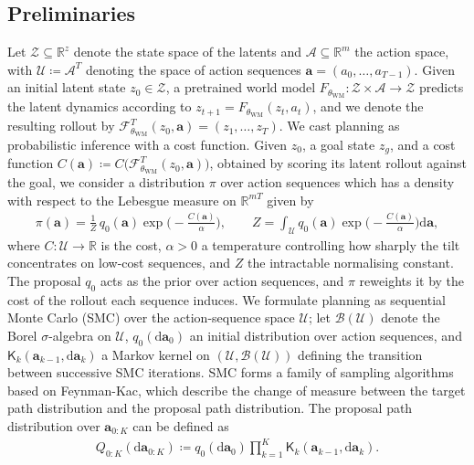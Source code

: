 \subsection{Preliminaries}

Let $\mathcal{Z}\subseteq\mathbb{R}^{z}$ denote the state space of the latents and $\mathcal{A}\subseteq\mathbb{R}^{m}$ the action space, with $\mathcal{U}\coloneqq\mathcal{A}^T$ denoting the space of action sequences $\mathbf{a}=(a_0,\ldots,a_{T-1})$. Given an initial latent state $z_0\in\mathcal{Z}$, a pretrained world model $F_{\theta_{\mathrm{WM}}}:\mathcal{Z}\times\mathcal{A}\rightarrow\mathcal{Z}$ predicts the latent dynamics according to $z_{t+1}=F_{\theta_{\mathrm{WM}}}(z_t,a_t)$, and we denote the resulting rollout by $\mathcal{F}_{\theta_{\mathrm{WM}}}^T(z_0,\mathbf{a})=(z_1,\ldots,z_T)$. We cast planning as probabilistic inference with a cost function. Given $z_0$, a goal state $z_g$, and a cost function  $C(\mathbf{a})\coloneqq C\big(\mathcal{F}^T_{\theta_{\mathrm{WM}}}(z_0,\mathbf{a})\big)$,
obtained by scoring its latent rollout against the goal, we consider a distribution $\pi$ over action sequences which has a density with respect to the Lebesgue measure on $\mathbb{R}^{mT}$ given by
\begin{align}\label{eq:planning_target}
\pi(\mathbf{a}) = \frac{1}{Z}\,q_0(\mathbf{a})\exp\!\Big(-\frac{C(\mathbf{a})}{\alpha}\Big),
\qquad
Z = \int_{\mathcal{U}} q_0(\mathbf{a})\exp\!\Big(-\frac{C(\mathbf{a})}{\alpha}\Big)\mathrm{d}\mathbf{a},
\end{align}
where $C:\mathcal{U}\rightarrow\mathbb{R}$ is the cost, $\alpha>0$ a temperature
controlling how sharply the tilt concentrates on low-cost sequences, and $Z$ the
intractable normalising constant. The proposal $q_0$ acts as the prior over action
sequences, and $\pi$ reweights it by the cost of the rollout each sequence induces. We formulate planning as sequential Monte Carlo (SMC) over the action-sequence space $\mathcal{U}$; let $\mathcal{B}(\mathcal{U})$ denote the Borel $\sigma$-algebra on $\mathcal{U}$, $q_0(\mathrm{d}\mathbf{a}_0)$ an initial distribution over action sequences, and $\mathsf{K}_k(\mathbf{a}_{k-1},\mathrm{d}\mathbf{a}_k)$ a Markov kernel on $(\mathcal{U},\mathcal{B}(\mathcal{U}))$ defining the transition between successive SMC iterations. SMC forms a family of sampling algorithms based on Feynman-Kac, which describe the change of measure between the target path distribution and the proposal path distribution. The proposal path distribution over $\mathbf{a}_{0:K}$ can be defined as 
\begin{align}
Q_{0:K}(\mathrm{d}\mathbf{a}_{0:K})
\coloneqq
q_0(\mathrm{d}\mathbf{a}_0)
\prod_{k=1}^{K}
\mathsf{K}_k(\mathbf{a}_{k-1},\mathrm{d}\mathbf{a}_k).
\end{align}

